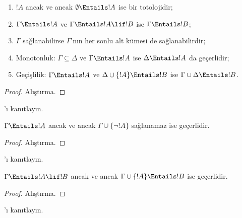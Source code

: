 \begin{prop}
\begin{enumerate} 
\item $!A$ ancak ve ancak $\emptyset \Entails !A$ ise bir totolojidir; 
\item $\Gamma \Entails !A$ ve $\Gamma \Entails !A \lif !B$ ise
  $\Gamma \Entails !B$;
\item $\Gamma$ sağlanabilirse $\Gamma$'nın her sonlu alt kümesi de
  sağlanabilirdir; 
\item {} Monotonluk: $\Gamma \subseteq \Delta$ ve
  $\Gamma \Entails !A$ ise $\Delta \Entails !A$ da geçerlidir;
\item {} Geçişlilik: $\Gamma \Entails !A$ ve
  $\Delta \cup \{ !A\} \Entails !B$ ise $\Gamma \cup \Delta \Entails
  !B$.
\end{enumerate}
\end{prop}

\begin{proof}
Alıştırma.
\end{proof}

\begin{prob}
'ı kanıtlayın.
\end{prob}

\begin{prop}
  $\Gamma \Entails !A$ ancak ve ancak $\Gamma \cup \{\lnot !A\}$
  sağlanamaz ise geçerlidir.
\end{prop}

\begin{proof}
Alıştırma.
\end{proof}

\begin{prob}
'ı kanıtlayın.
\end{prob}

\begin{thm}
   $\Gamma \Entails !A \lif !B$ ancak ve ancak
  $\Gamma \cup \{!A\} \Entails !B$ ise geçerlidir.
\end{thm}

\begin{proof}
Alıştırma.
\end{proof}

\begin{prob}
'ı kanıtlayın.
\end{prob}

